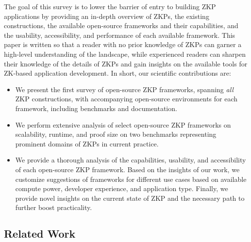 The goal of this survey is to lower the barrier of entry to building ZKP applications by providing an in-depth overview of ZKPs, the existing constructions, the available open-source frameworks and their capabilities, and the usability, accessibility, and performance of each available framework. This paper is written so that a reader with no prior knowledge of ZKPs can garner a high-level understanding of the landscape, while experienced readers can sharpen their knowledge of the details of ZKPs and gain insights on the available tools for ZK-based application development. In short, our scientific contributions are:
\begin{itemize}
    \item We present the first survey of open-source ZKP frameworks, spanning \textit{all} ZKP constructions, with accompanying open-source environments for each framework, including benchmarks and documentation.
    \item We perform extensive analysis of select open-source ZKP frameworks on scalability, runtime, and proof size on two benchmarks representing prominent domains of ZKPs in current practice.
    \item We provide a thorough analysis of the capabilities, usability, and accessibility of each open-source ZKP framework.  Based on the insights of our work, we customize suggestions of frameworks for different use cases based on available compute power, developer experience, and application type. Finally, we provide novel insights on the current state of ZKP and the necessary path to further boost practicality.
\end{itemize}

\subsection{Related Work}


